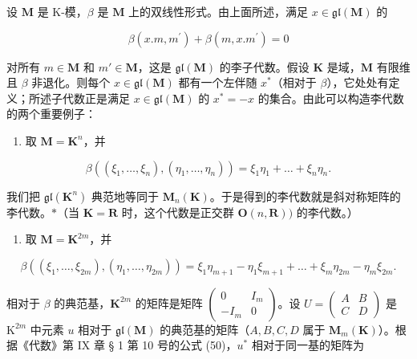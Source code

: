 设 \(\mathbf{M}\) 是 K-模，\(\beta\) 是 \(\mathbf{M}\) 上的双线性形式。由上面所述，满足 \(x \in \mathfrak{gl}(\mathbf{M})\) 的

\[
\beta (x. m, m ^ {\prime}) + \beta (m, x. m ^ {\prime}) = 0
\]

对所有 \(m \in \mathbf{M}\) 和 \(m' \in \mathbf{M}\)，这是 \(\mathfrak{gl}(\mathbf{M})\) 的李子代数。假设 \(\mathbf{K}\) 是域，\(\mathbf{M}\) 有限维且 \(\beta\) 非退化。则每个 \(x \in \mathfrak{gl}(\mathbf{M})\) 都有一个左伴随 \(x^*\)（相对于 \(\beta\)），它处处有定义；所述子代数正是满足 \(x \in \mathfrak{gl}(\mathbf{M})\) 的 \(x^* = -x\) 的集合。由此可以构造李代数的两个重要例子：

\begin{enumerate}
\def\labelenumi{(\alph{enumi})}
\tightlist
\item
  取 \(\mathbf{M} = \mathbf{K}^n\)，并
\end{enumerate}

\[
\beta ((\xi_ {1}, \dots , \xi_ {n}), (\eta_ {1}, \dots , \eta_ {n})) = \xi_ {1} \eta_ {1} + \dots + \xi_ {n} \eta_ {n}.
\]

我们把 \(\mathfrak{gl}(\mathbf{K}^n)\) 典范地等同于 \(\mathbf{M}_n(\mathbf{K})\)。于是得到的李代数就是斜对称矩阵的李代数。\(*\)（当 \(\mathbf{K} = \mathbf{R}\) 时，这个代数是正交群 \(\mathbf{O}(n, \mathbf{R}))\) 的李代数。）

\begin{enumerate}
\def\labelenumi{(\alph{enumi})}
\setcounter{enumi}{1}
\tightlist
\item
  取 \(\mathbf{M} = \mathbf{K}^{2m}\)，并
\end{enumerate}

\[
\beta ((\xi_ {1}, \dots , \xi_ {2 m}), (\eta_ {1}, \dots , \eta_ {2 m})) = \xi_ {1} \eta_ {m + 1} - \eta_ {1} \xi_ {m + 1} + \dots + \xi_ {m} \eta_ {2 m} - \eta_ {m} \xi_ {2 m}.
\]

相对于 \(\beta\) 的典范基，\(\mathbf{K}^{2m}\) 的矩阵是矩阵 \(\left( \begin{array}{cc}0 & I_m\\ -I_m & 0 \end{array} \right)\)。设 \(U = \left( \begin{array}{cc}A & B\\ C & D \end{array} \right)\) 是 \(\mathrm{K}^{2m}\) 中元素 \(u\) 相对于 \(\mathfrak{gl}(\mathbf{M})\) 的典范基的矩阵（\(A,B,C,D\) 属于 \(\mathbf{M}_m(\mathbf{K})\)）。根据《代数》第 IX 章 § 1 第 10 号的公式 (50)，\(u^*\) 相对于同一基的矩阵为

